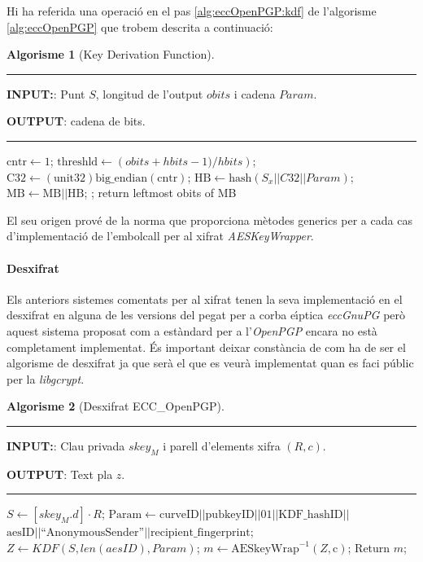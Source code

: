 \documentclass[12pt,twoside,catalan,a4paper]{book}%
\numberwithin{figure}{section}		%
\theoremstyle{definition}   			%
\def\ce{corba e\lgem{}\'{\i}ptica}%
\theoremstyle{saltolinea}   			%
\newtheorem{algo}{Algorisme}
\begin{document}
Hi ha referida una operaci\'o en el pas \ref{alg:eccOpenPGP:kdf} de l'algorisme \ref{alg:eccOpenPGP} que trobem descrita a continuaci\'o:

\begin{table}[H]
\begin{algo}[Key Derivation Function]\label{alg:KDF}
\parbox[b]{\linewidth}{%
\hrule
\smallskip
{\bf INPUT:}: Punt $S$, longitud de l'output $obits$ i cadena $Param$.

{\bf OUTPUT}: cadena de bits.
\vspace{1.5mm}
\hrule
}%
\begin{algorithmic}[1]
\STATE $\textrm{cntr}  \leftarrow  1$;
\STATE $\textrm{threshld}  \leftarrow \left(obits+hbits-1)/hbits\right)$;
\REPEAT
\STATE $\textrm{C32} \leftarrow \left(\textrm{unit32}\right)\textrm{big\_endian}\left(\textrm{cntr}\right)$;
\STATE $\textrm{HB} \leftarrow \textrm{hash}\left(S_{x} || C32 || Param\right)$;
\STATE $\textrm{MB} \leftarrow \textrm{MB} || \textrm{HB}$;
;
\STATE return leftmost obits of MB
\end{algorithmic}
\end{algo}
\end{table}

El seu origen prov\'e de la norma \cite{NIST800} que proporciona m\`etodes generics per a cada cas d'implementaci\'o de l'embolcall per al xifrat \emph{AESKeyWrapper}.

\paragraph{Desxifrat}

Els anteriors sistemes comentats per al xifrat tenen la seva implementaci\'o en el desxifrat en alguna de les versions del pegat per a \ce{} \emph{eccGnuPG} per\`o aquest sistema proposat com a est\`andard per a l'\emph{OpenPGP} encara no est\`a completament implementat. \'Es important deixar const\`ancia de com ha de ser el algorisme de desxifrat ja que ser\`a el que es veur\`a implementat quan es faci p\'ublic per la \emph{libgcrypt}.

\begin{table}[H]
\begin{algo}[Desxifrat ECC\_OpenPGP]\label{alg:deseccOpenPGP}
 \parbox[b]{\linewidth}{%
\hrule
\smallskip
{\bf INPUT:}: Clau privada $skey_{M}$ i parell d'elements xifra $\left(R,c\right)$.

{\bf OUTPUT}: Text pla $z$.
\vspace{1.5mm}
\hrule
}%
\begin{algorithmic}[1]
\STATE $S \leftarrow \left[skey_{M}.d\right]\cdot R$;
\STATE $\textrm{Param}  \leftarrow \textrm{curveID} || \textrm{pubkeyID} || 01 || \textrm{KDF\_hashID} || $\\$ \textrm{aesID} || \textrm{``AnonymousSender''} || \textrm{recipient\_fingerprint}$;
\STATE $Z \leftarrow KDF\left(S,len\left(aesID\right),Param\right)$;\label{alg:deseccOpenPGP:kdf}
\STATE $m \leftarrow \textrm{AESkeyWrap}^{-1}\left(Z,\textrm{c}\right)$;
\STATE Return $m$;
\end{algorithmic}
\end{algo}
\end{table}
\end{document}

